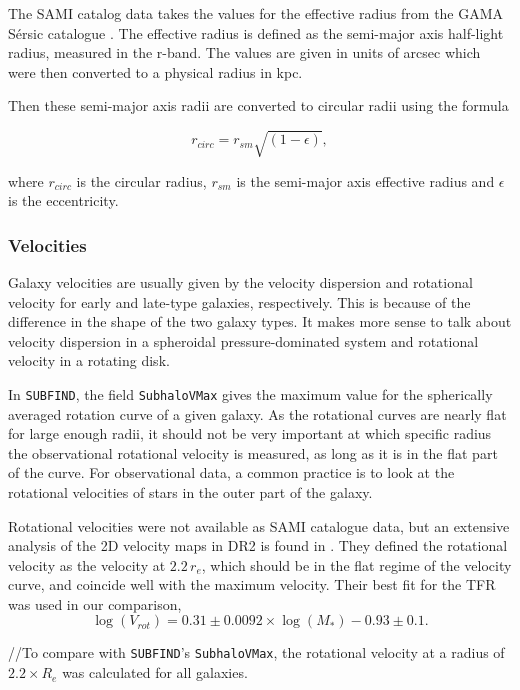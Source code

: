 The SAMI catalog data takes the values for the effective radius from the GAMA Sérsic catalogue \parencite{Driver2011}. The effective radius is defined as the semi-major axis half-light radius, measured in the r-band. The values are given in units of arcsec which were then converted to a physical radius in kpc.

Then these semi-major axis radii are converted to circular radii using the formula

\begin{equation}
   r_{circ} = r_{sm}\sqrt{(1-\epsilon)},
\end{equation}

where $r_{circ}$ is the circular radius, $r_{sm}$ is the semi-major axis effective radius and $\epsilon$ is the eccentricity.


\subsubsection{Velocities}

Galaxy velocities are usually given by the velocity dispersion and rotational velocity for early and late-type galaxies, respectively. This is because of the difference in the shape of the two galaxy types. It makes more sense to talk about velocity dispersion in a spheroidal pressure-dominated system and rotational velocity in a rotating disk.

In \texttt{SUBFIND}, the field \texttt{SubhaloVMax} gives the maximum value for the spherically averaged rotation curve of a given galaxy. As the rotational curves are nearly flat for large enough radii, it should not be very important at which specific radius the observational rotational velocity is measured, as long as it is in the flat part of the curve. For observational data, a common practice is to look at the rotational velocities of stars in the outer part of the galaxy. 

Rotational velocities were not available as SAMI catalogue data, but an extensive analysis of the 2D velocity maps in DR2 is found in \textcite{Bloom2017}. They defined the rotational velocity as the velocity at $2.2\, r_e$, which should be in the flat regime of the velocity curve, and coincide well with the maximum velocity. Their best fit for the TFR was used in our comparison, 
\begin{equation}
	\log(V_{rot}) = 0.31 \pm 0.0092 \times \log(M_*)-0.93 \pm 0.1.
\end{equation}

//To compare with \texttt{SUBFIND}'s \texttt{SubhaloVMax}, the rotational velocity at a radius of $2.2 \times R_e$ was calculated for all galaxies.

